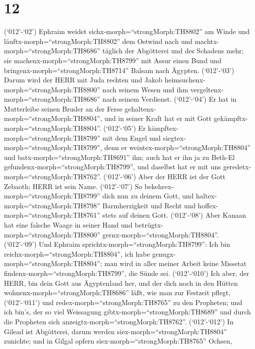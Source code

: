 \hypertarget{section-11}{%
\section{12}\label{section-11}}

 (`012'-`02') Ephraim weidet
sichx-morph=``strongMorph:TH8802'' am Winde und
läuftx-morph=``strongMorph:TH8802'' dem Ostwind nach und
machtx-morph=``strongMorph:TH8686'' täglich der Abgötterei und des
Schadens mehr; sie machenx-morph=``strongMorph:TH8799'' mit Assur einen
Bund und bringenx-morph=``strongMorph:TH8714'' Balsam nach Ägypten.
 (`012'-`03') Darum wird der HERR mit Juda rechten und Jakob
heimsuchenx-morph=``strongMorph:TH8800'' nach seinem Wesen und ihm
vergeltenx-morph=``strongMorph:TH8686'' nach seinem Verdienst.
 (`012'-`04') Er hat in Mutterleibe seinen Bruder an der
Ferse gehaltenx-morph=``strongMorph:TH8804'', und in seiner Kraft hat er
mit Gott gekämpftx-morph=``strongMorph:TH8804''. 
(`012'-`05') Er kämpftex-morph=``strongMorph:TH8799'' mit dem Engel und
siegtex-morph=``strongMorph:TH8799'', denn er
weintex-morph=``strongMorph:TH8804'' und
batx-morph=``strongMorph:TH8691'' ihn; auch hat er ihn ja zu Beth-El
gefundenx-morph=``strongMorph:TH8799'', und daselbst hat er mit uns
geredetx-morph=``strongMorph:TH8762''.  (`012'-`06') Aber
der HERR ist der Gott Zebaoth; HERR ist sein Name. 
(`012'-`07') So bekehrex-morph=``strongMorph:TH8799'' dich nun zu deinem
Gott, und haltex-morph=``strongMorph:TH8798'' Barmherzigkeit und Recht
und hoffex-morph=``strongMorph:TH8761'' stets auf deinen Gott.
 (`012'-`08') Aber Kanaan hat eine falsche Waage in seiner
Hand und betrügtx-morph=``strongMorph:TH8800''
gernx-morph=``strongMorph:TH8804''.  (`012'-`09') Und
Ephraim sprichtx-morph=``strongMorph:TH8799'': Ich bin
reichx-morph=``strongMorph:TH8804'', ich habe
genugx-morph=``strongMorph:TH8804''; man wird in aller meiner Arbeit
keine Missetat findenx-morph=``strongMorph:TH8799'', die Sünde sei.
 (`012'-`010') Ich aber, der HERR, bin dein Gott aus
Ägyptenland her, und der dich noch in den Hütten
wohnenx-morph=``strongMorph:TH8686'' läßt, wie man zur Festzeit pflegt,
 (`012'-`011') und redex-morph=``strongMorph:TH8765'' zu
den Propheten; und ich bin's, der so viel Weissagung
gibtx-morph=``strongMorph:TH8689'' und durch die Propheten sich
anzeigtx-morph=``strongMorph:TH8762''.  (`012'-`012') In
Gilead ist Abgötterei, darum werden siex-morph=``strongMorph:TH8804''
zunichte; und in Gilgal opfern siex-morph=``strongMorph:TH8765'' Ochsen,
